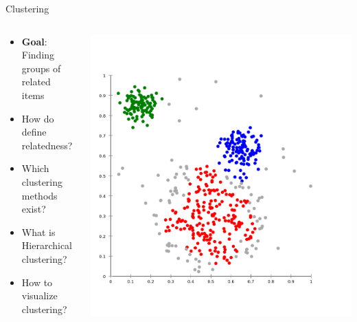\documentclass{beamer}\usepackage[]{graphicx}\usepackage[]{color}
\begin{document}
\begin{frame}[fragile]{Clustering}
  \begin{columns}
    \begin{column}{.5\linewidth}
      \begin{itemize}
        \item \textbf{Goal}: Finding groups of related items
          \vspace{1cm}
        \item How do define relatedness?
        \item Which clustering methods exist?
        \item What is Hierarchical clustering?
        \item How to visualize clustering?
      \end{itemize}
    \end{column}
    \begin{column}{.5\linewidth}
      \begin{center}
        \includegraphics[width=.8\linewidth]{clust.png}
      \end{center}
    \end{column}
  \end{columns}
\end{frame}
\end{document}
